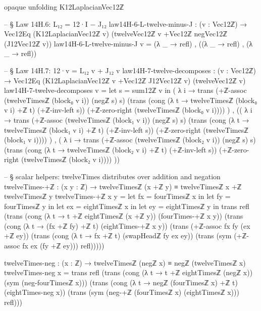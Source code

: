 \documentclass[11pt,a4paper]{book}
\begin{document}
\begin{code}
opaque
  unfolding K12LaplacianVec12ℤ

  -- § Law 14H.6: L₁₂ = 12·I − J₁₂
  law14H-6-L-twelve-minus-J : (v : Vec12ℤ) →
    Vec12Eq (K12LaplacianVec12ℤ v) (twelveVec12ℤ v +Vec12ℤ negVec12ℤ (J12Vec12ℤ v))
  law14H-6-L-twelve-minus-J v =
    (λ _ → refl) ,
    ((λ _ → refl) ,
     (λ _ → refl))

  -- § Law 14H.7: 12·v = L₁₂ v + J₁₂ v
  law14H-7-twelve-decomposes : (v : Vec12ℤ) →
    Vec12Eq (K12LaplacianVec12ℤ v +Vec12ℤ J12Vec12ℤ v) (twelveVec12ℤ v)
  law14H-7-twelve-decomposes v =
    let s = sum12ℤ v in
    ( λ i →
        trans
          (+ℤ-assoc (twelveTimesℤ (block₀ v i)) (negℤ s) s)
          (trans
            (cong (λ t → twelveTimesℤ (block₀ v i) +ℤ t) (+ℤ-inv-left s))
            (+ℤ-zero-right (twelveTimesℤ (block₀ v i))))
    ) ,
    (( λ i →
          trans
            (+ℤ-assoc (twelveTimesℤ (block₁ v i)) (negℤ s) s)
            (trans
              (cong (λ t → twelveTimesℤ (block₁ v i) +ℤ t) (+ℤ-inv-left s))
              (+ℤ-zero-right (twelveTimesℤ (block₁ v i))))
      ) ,
     ( λ i →
          trans
            (+ℤ-assoc (twelveTimesℤ (block₂ v i)) (negℤ s) s)
            (trans
              (cong (λ t → twelveTimesℤ (block₂ v i) +ℤ t) (+ℤ-inv-left s))
              (+ℤ-zero-right (twelveTimesℤ (block₂ v i))))
      ))

  -- § scalar helpers: twelveTimes distributes over addition and negation
  twelveTimes-+ℤ : (x y : ℤ) → twelveTimesℤ (x +ℤ y) ≡ twelveTimesℤ x +ℤ twelveTimesℤ y
  twelveTimes-+ℤ x y =
    let fx = fourTimesℤ x in
    let fy = fourTimesℤ y in
    let ex = eightTimesℤ x in
    let ey = eightTimesℤ y in
    trans
      refl
      (trans
        (cong (λ t → t +ℤ eightTimesℤ (x +ℤ y)) (fourTimes-+ℤ x y))
        (trans
          (cong (λ t → (fx +ℤ fy) +ℤ t) (eightTimes-+ℤ x y))
          (trans
            (+ℤ-assoc fx fy (ex +ℤ ey))
            (trans
              (cong (λ t → fx +ℤ t) (swapHeadℤ fy ex ey))
              (trans
                (sym (+ℤ-assoc fx ex (fy +ℤ ey)))
                refl)))))

  twelveTimes-neg : (x : ℤ) → twelveTimesℤ (negℤ x) ≡ negℤ (twelveTimesℤ x)
  twelveTimes-neg x =
    trans
      refl
      (trans
        (cong (λ t → t +ℤ eightTimesℤ (negℤ x)) (sym (neg-fourTimesℤ x)))
        (trans
          (cong (λ t → negℤ (fourTimesℤ x) +ℤ t) (eightTimes-neg x))
          (trans
            (sym (neg-+ℤ (fourTimesℤ x) (eightTimesℤ x)))
            refl)))


\end{code}
\end{document}
